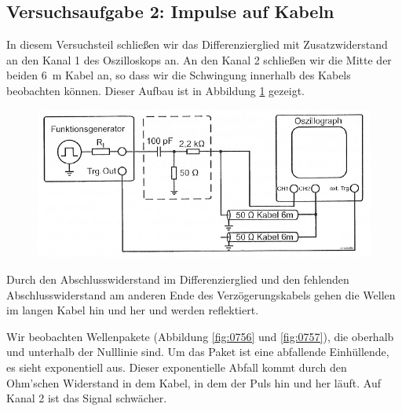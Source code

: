 \FloatBarrier
\subsection{Versuchsaufgabe 2: Impulse auf Kabeln}

In diesem Versuchsteil schließen wir das Differenzierglied mit Zusatzwiderstand
an den Kanal 1 des Oszilloskops an. An den Kanal 2 schließen wir die Mitte der
beiden \SI{6}{\meter} Kabel an, so dass wir die Schwingung innerhalb des Kabels
beobachten können. Dieser Aufbau ist in Abbildung \ref{fig:1-7} gezeigt.

\begin{figure}[htbp]
	\centering
	\includegraphics[width=.7\textwidth]{Schaltplan/1-7.png}
	\caption{%
		\cite[Abbildung~1.7]{physik313-Anleitung}
	}
	\label{fig:1-7}
\end{figure}

Durch den Abschlusswiderstand im Differenzierglied und den
fehlenden Abschlusswiderstand am anderen Ende des Verzögerungskabels gehen die
Wellen im langen Kabel hin und her und werden reflektiert.

Wir beobachten Wellenpakete (Abbildung \ref{fig:0756} und \ref{fig:0757}), die
oberhalb und unterhalb der Nulllinie sind. Um das Paket ist eine abfallende
Einhüllende, es sieht exponentiell aus. Dieser exponentielle Abfall kommt durch
den Ohm'schen Widerstand in dem Kabel, in dem der Puls hin und her läuft. Auf
Kanal 2 ist das Signal schwächer.

